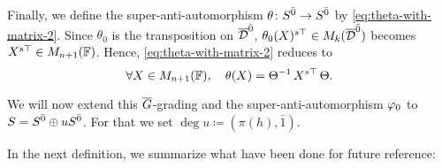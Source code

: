 
Finally, we define the super-anti-automorphism $\theta\colon S^{\bar0} \to S^{\bar0}$ by \cref{eq:theta-with-matrix-2}. 
Since $\theta_0$ is the transposition on $\barr \D\even$, $\theta_0(X)\stransp \in M_{k} (\barr \D\even)$ becomes $X^{s\top} \in M_{n+1}(\mathbb{F})$. 
Hence, \cref{eq:theta-with-matrix-2} reduces to 
\[\label{eq:theta-with-matrix-4}
    \forall X\in M_{n+1}(\mathbb{F}), \quad \theta(X) = \Theta^{-1}\, X^{s\top}\, \Theta.
\]

We will now extend this $\barr G$-grading and the super-anti-automorphism $\varphi_0$ to $S = S^{\bar0} \oplus u S^{\bar0}$. 
For that we set $\deg u \coloneqq (\pi(h), \bar 1)$. 



In the next definition, we summarize what have been done for future reference:

